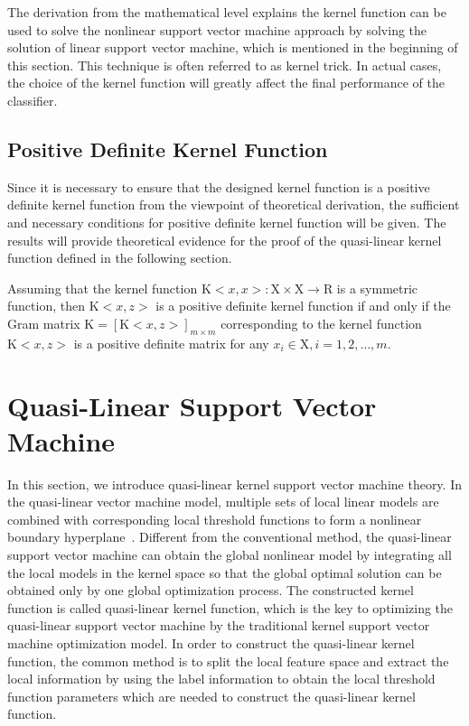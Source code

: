 \documentclass[master]{IPSstyle}
\begin{document}
{The derivation from the mathematical level explains the kernel function can be used to solve the nonlinear support vector machine approach by solving the solution of linear support vector machine, which is mentioned in the beginning of this section. This technique is often referred to as kernel trick. In actual cases, the choice of the kernel function will greatly affect the final performance of the classifier.

\subsection{Positive Definite Kernel Function}
Since it is necessary to ensure that the designed kernel function is a positive definite kernel function from the viewpoint of theoretical derivation, the sufficient and necessary conditions for positive definite kernel function will be given. The results will provide theoretical evidence for the proof of the quasi-linear kernel function defined in the following section.

Assuming that the kernel function $\mathrm{K}<x,x>: \mathrm{X}\times \mathrm{X} \to \mathrm{R}$ is a symmetric function, then $\mathrm{K}<x, z>$ is a positive definite kernel function if and only if the Gram matrix $\mathrm{K} = [\mathrm{K}<x,z>]_{m\times m}$ corresponding to the kernel function $\mathrm{K}<x,z>$ is a positive definite matrix for any $x_i \in \mathrm{X}, i = 1, 2, \dots, m$.

\section{Quasi-Linear Support Vector Machine}
In this section, we introduce quasi-linear kernel support vector machine theory. In the quasi-linear vector machine model, multiple sets of local linear models are combined with corresponding local threshold functions to form a nonlinear boundary hyperplane~\cite{bo2014quasi, chen2010local}. Different from the conventional method, the quasi-linear support vector machine can obtain the global nonlinear model by integrating all the local models in the kernel space so that the global optimal solution can be obtained only by one global optimization process. The constructed kernel function is called quasi-linear kernel function, which is the key to optimizing the quasi-linear support vector machine by the traditional kernel support vector machine optimization model. In order to construct the quasi-linear kernel function, the common method is to split the local feature space and extract the local information by using the label information to obtain the local threshold function parameters which are needed to construct the quasi-linear kernel function.

}
\end{document}
